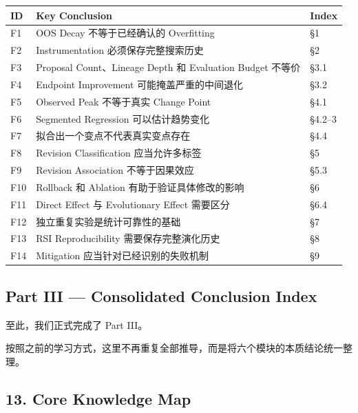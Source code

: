 \begin{readertable}
\begin{longtable}[]{@{}
  >{\raggedright\arraybackslash}p{}
  >{\raggedright\arraybackslash}p{}
  >{\raggedright\arraybackslash}p{}@{}}
\toprule
ID & Key Conclusion & Index \\
\midrule
\endhead
F1 & OOS Decay 不等于已经确认的 Overfitting & §1 \\
F2 & Instrumentation 必须保存完整搜索历史 & §2 \\
F3 & Proposal Count、Lineage Depth 和 Evaluation Budget 不等价 & §3.1 \\
F4 & Endpoint Improvement 可能掩盖严重的中间退化 & §3.2 \\
F5 & Observed Peak 不等于真实 Change Point & §4.1 \\
F6 & Segmented Regression 可以估计趋势变化 & §4.2--3 \\
F7 & 拟合出一个变点不代表真实变点存在 & §4.4 \\
F8 & Revision Classification 应当允许多标签 & §5 \\
F9 & Revision Association 不等于因果效应 & §5.3 \\
F10 & Rollback 和 Ablation 有助于验证具体修改的影响 & §6 \\
F11 & Direct Effect 与 Evolutionary Effect 需要区分 & §6.4 \\
F12 & 独立重复实验是统计可靠性的基础 & §7 \\
F13 & RSI Reproducibility 需要保存完整演化历史 & §8 \\
F14 & Mitigation 应当针对已经识别的失败机制 & §9 \\
\bottomrule
\end{longtable}
\end{readertable}

\hypertarget{part-3-48-0001-part-iii-consolidated-conclusion-index}{%
\subsection{Part III --- Consolidated Conclusion Index}\label{part-3-48-0001-part-iii-consolidated-conclusion-index}}

至此，我们正式完成了 Part III。

按照之前的学习方式，这里不再重复全部推导，而是将六个模块的本质结论统一整理。

\hypertarget{part-3-48-0001-core-knowledge-map}{%
\subsection{13. Core Knowledge Map}\label{part-3-48-0001-core-knowledge-map}}

